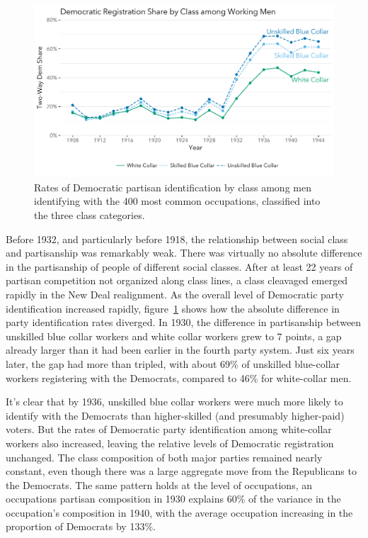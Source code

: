 \documentclass[11pt]{scrartcl}\usepackage[]{graphicx}\usepackage[]{color}
\makeatletter
\def\maxwidth{ %
  \ifdim\Gin@nat@width>\linewidth
    \linewidth
  \else
    \Gin@nat@width
  \fi
}
\newenvironment{knitrout}{}{} %
\makeatother
\begin{document}
\begin{knitrout}
\color{fgcolor}\begin{figure}

{\centering \includegraphics[width=\maxwidth]{figures/plots-class-1} 

}

\caption[Rates of Democratic partisan identification by class among men identifying with the 400 most common occupations, classified into the three class categories]{Rates of Democratic partisan identification by class among men identifying with the 400 most common occupations, classified into the three class categories.}\label{fig:class}
\end{figure}


\end{knitrout}

Before 1932, and particularly before 1918, the relationship between social class and partisanship was remarkably weak. There was virtually no absolute difference in the partisanship of people of different social classes. After at least 22 years of partisan competition not organized along class lines, a class cleavaged emerged rapidly in the New Deal realignment. As the overall level of Democratic party identification increased rapidly, figure~\ref{fig:class} shows how the absolute difference in party identification rates diverged.  In 1930, the difference in partisanship between unskilled blue collar workers and white collar workers grew to 7 points, a gap already larger than it had been earlier in the fourth party system. Just six years later, the gap had more than tripled, with about 69\% of unskilled blue-collar workers registering with the Democrats, compared to 46\% for white-collar men.

It's clear that by 1936, unskilled blue collar workers were much more likely to identify with the Democrats than higher-skilled (and presumably higher-paid) voters. But the rates of Democratic party identification among white-collar workers also increased, leaving the relative levels of Democratic registration unchanged. The class composition of both major parties remained nearly constant, even though there was a large aggregate move from the Republicans to the Democrats. The same pattern holds at the level of occupations, an occupations partisan composition in 1930 explains 60\% of the variance in the occupation's composition in 1940, with the average occupation increasing in the proportion of Democrats by 133\%.
\end{document}
